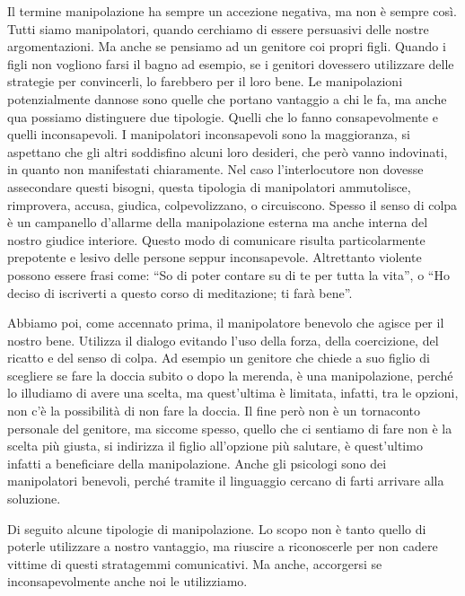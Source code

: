 \documentclass[12pt]{book} %
\begin{document}
Il termine manipolazione ha sempre un accezione negativa, ma non è sempre così. Tutti siamo manipolatori, quando
cerchiamo di essere persuasivi delle nostre argomentazioni. Ma anche se pensiamo ad un genitore coi propri figli.
Quando i figli non vogliono farsi il bagno ad esempio, se i genitori dovessero utilizzare delle strategie per
convincerli, lo farebbero per il loro bene. Le manipolazioni potenzialmente dannose sono quelle che portano vantaggio a
chi le fa, ma anche qua possiamo distinguere due tipologie. Quelli che lo fanno consapevolmente e quelli inconsapevoli.
I manipolatori inconsapevoli sono la maggioranza, si aspettano che gli altri soddisfino alcuni loro desideri, che però
vanno indovinati, in quanto non manifestati chiaramente. Nel caso l'interlocutore non dovesse
assecondare questi bisogni, questa tipologia di manipolatori ammutolisce, rimprovera, accusa, giudica, colpevolizzano,
o circuiscono. Spesso il senso di colpa è un campanello d'allarme della manipolazione esterna ma
anche interna del nostro giudice interiore. Questo modo di comunicare risulta particolarmente prepotente e lesivo delle
persone seppur inconsapevole. Altrettanto violente possono essere frasi come: “So di poter contare su di te per tutta
la vita”, o “Ho deciso di iscriverti a questo corso di meditazione; ti farà bene”. 


\bigskip

Abbiamo poi, come accennato prima, il manipolatore benevolo che agisce per il nostro bene. Utilizza il dialogo evitando
l'uso della forza, della coercizione, del ricatto e del senso di colpa. Ad esempio un genitore che
chiede a suo figlio di scegliere se fare la doccia subito o dopo la merenda, è una manipolazione, perché lo illudiamo
di avere una scelta, ma quest'ultima è limitata, infatti, tra le opzioni, non
c'è la possibilità di non fare la doccia. Il fine però non è un tornaconto personale del genitore,
ma siccome spesso, quello che ci sentiamo di fare non è la scelta più giusta, si indirizza il figlio
all'opzione più salutare, è quest'ultimo infatti a beneficiare della
manipolazione. Anche gli psicologi sono dei manipolatori benevoli, perché tramite il linguaggio cercano di farti
arrivare alla soluzione.


\bigskip

Di seguito alcune tipologie di manipolazione. Lo scopo non è tanto quello di poterle utilizzare a nostro vantaggio, ma
riuscire a riconoscerle per non cadere vittime di questi stratagemmi comunicativi. Ma anche, accorgersi se
inconsapevolmente anche noi le utilizziamo.
\end{document}
